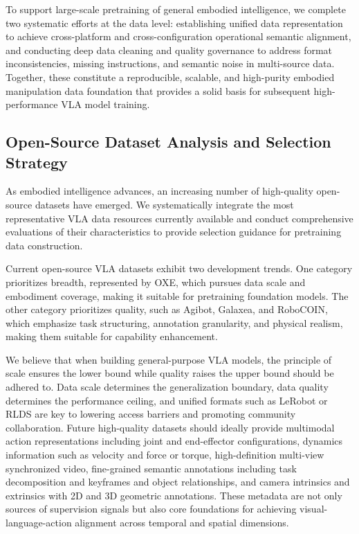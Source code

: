 \documentclass[11pt,a4paper]{article}
\begin{document}
To support large-scale pretraining of general embodied intelligence, we complete two systematic efforts at the data level: establishing unified data representation to achieve cross-platform and cross-configuration operational semantic alignment, and conducting deep data cleaning and quality governance to address format inconsistencies, missing instructions, and semantic noise in multi-source data. Together, these constitute a reproducible, scalable, and high-purity embodied manipulation data foundation that provides a solid basis for subsequent high-performance VLA model training.

\subsection{Open-Source Dataset Analysis and Selection Strategy}

As embodied intelligence advances, an increasing number of high-quality open-source datasets have emerged. We systematically integrate the most representative VLA data resources currently available and conduct comprehensive evaluations of their characteristics to provide selection guidance for pretraining data construction.

Current open-source VLA datasets exhibit two development trends. One category prioritizes breadth, represented by OXE, which pursues data scale and embodiment coverage, making it suitable for pretraining foundation models. The other category prioritizes quality, such as Agibot, Galaxea, and RoboCOIN, which emphasize task structuring, annotation granularity, and physical realism, making them suitable for capability enhancement.

We believe that when building general-purpose VLA models, the principle of scale ensures the lower bound while quality raises the upper bound should be adhered to. Data scale determines the generalization boundary, data quality determines the performance ceiling, and unified formats such as LeRobot or RLDS are key to lowering access barriers and promoting community collaboration. Future high-quality datasets should ideally provide multimodal action representations including joint and end-effector configurations, dynamics information such as velocity and force or torque, high-definition multi-view synchronized video, fine-grained semantic annotations including task decomposition and keyframes and object relationships, and camera intrinsics and extrinsics with 2D and 3D geometric annotations. These metadata are not only sources of supervision signals but also core foundations for achieving visual-language-action alignment across temporal and spatial dimensions.
\end{document}
